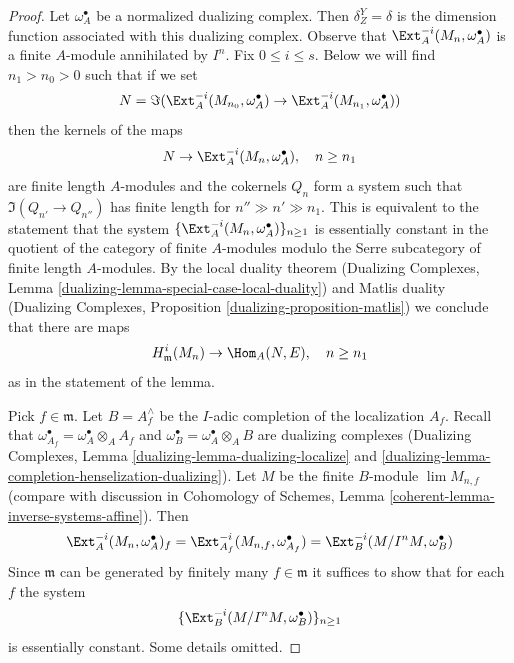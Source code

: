 \begin{proof}

Let $\omega_A^\bullet$ be a normalized dualizing complex. Then
$\delta^Y_Z = \delta$ is the dimension function associated with
this dualizing complex.
Observe that $\Ext^{-i}_A(M_n, \omega_A^\bullet)$ is a finite $A$-module
annihilated by $I^n$. Fix $0 \leq i \leq s$.
Below we will find $n_1 > n_0 > 0$ such that if we set
$$
N = \Im(\Ext^{-i}_A(M_{n_0}, \omega_A^\bullet) \to
\Ext^{-i}_A(M_{n_1}, \omega_A^\bullet))
$$
then the kernels of the maps
$$
N \to \Ext^{-i}_A(M_n, \omega_A^\bullet),\quad n \geq n_1
$$
are finite length $A$-modules and the cokernels $Q_n$ form a
system such that $\Im(Q_{n'} \to Q_{n''})$ has finite length
for $n'' \gg n' \gg n_1$. This is equivalent to the statement that
the system $\{\Ext^{-i}_A(M_n, \omega_A^\bullet)\}_{n \geq 1}$
is essentially constant in the quotient of the category of finite
$A$-modules modulo the Serre subcategory of finite length $A$-modules.
By the local duality theorem
(Dualizing Complexes, Lemma \ref{dualizing-lemma-special-case-local-duality})
and Matlis duality
(Dualizing Complexes, Proposition \ref{dualizing-proposition-matlis})
we conclude that there are maps
$$
H^i_\mathfrak m(M_n) \to \Hom_A(N, E),\quad n \geq n_1
$$
as in the statement of the lemma.

\medskip\noindent
Pick $f \in \mathfrak m$. Let $B = A_f^\wedge$ be the $I$-adic completion
of the localization $A_f$. Recall that
$\omega_{A_f}^\bullet = \omega_A^\bullet \otimes_A A_f$
and $\omega_B^\bullet = \omega_A^\bullet \otimes_A B$ are dualizing
complexes (Dualizing Complexes, Lemma \ref{dualizing-lemma-dualizing-localize}
and \ref{dualizing-lemma-completion-henselization-dualizing}).
Let $M$ be the finite $B$-module $\lim M_{n, f}$ (compare with
discussion in Cohomology of Schemes, Lemma
\ref{coherent-lemma-inverse-systems-affine}). Then
$$
\Ext^{-i}_A(M_n, \omega_A^\bullet)_f =
\Ext^{-i}_{A_f}(M_{n, f}, \omega_{A_f}^\bullet) =
\Ext^{-i}_B(M/I^n M, \omega_B^\bullet)
$$
Since $\mathfrak m$ can be generated by finitely many $f \in \mathfrak m$
it suffices to show that for each $f$ the system
$$
\{\Ext^{-i}_B(M/I^n M, \omega_B^\bullet)\}_{n \geq 1}
$$
is essentially constant. Some details omitted.


\end{proof}
